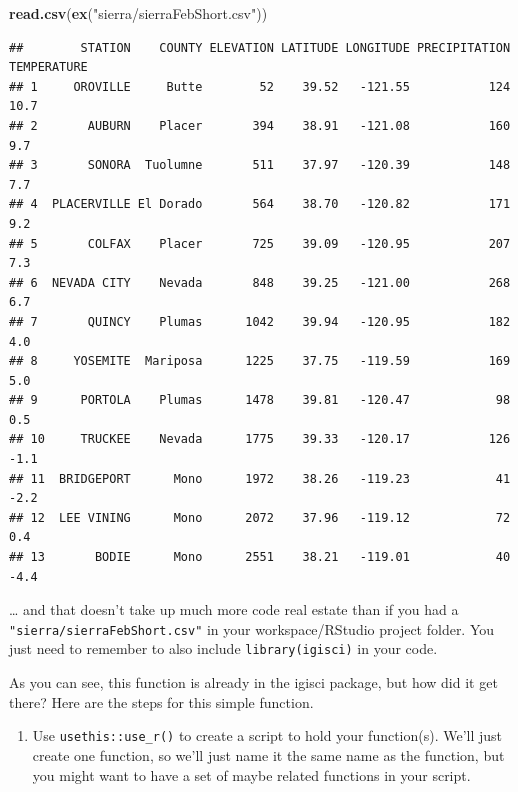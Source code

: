 \documentclass[
]{book}
\newenvironment{Shaded}{\begin{snugshade}}{\end{snugshade}}
\newcommand{\FunctionTok}[1]{\textcolor[rgb]{0.27,0.27,0.27}{\textbf{#1}}}
\newcommand{\NormalTok}[1]{#1}
\newcommand{\StringTok}[1]{\textcolor[rgb]{0.5,0.5,0.5}{#1}}
\providecommand{\tightlist}{%
  \setlength{\itemsep}{0pt}\setlength{\parskip}{0pt}}
\begin{document}
\begin{Shaded}
\begin{Highlighting}[]
\FunctionTok{read.csv}\NormalTok{(}\FunctionTok{ex}\NormalTok{(}\StringTok{"sierra/sierraFebShort.csv"}\NormalTok{))}
\end{Highlighting}
\end{Shaded}

\begin{verbatim}
##        STATION    COUNTY ELEVATION LATITUDE LONGITUDE PRECIPITATION TEMPERATURE
## 1     OROVILLE     Butte        52    39.52   -121.55           124        10.7
## 2       AUBURN    Placer       394    38.91   -121.08           160         9.7
## 3       SONORA  Tuolumne       511    37.97   -120.39           148         7.7
## 4  PLACERVILLE El Dorado       564    38.70   -120.82           171         9.2
## 5       COLFAX    Placer       725    39.09   -120.95           207         7.3
## 6  NEVADA CITY    Nevada       848    39.25   -121.00           268         6.7
## 7       QUINCY    Plumas      1042    39.94   -120.95           182         4.0
## 8     YOSEMITE  Mariposa      1225    37.75   -119.59           169         5.0
## 9      PORTOLA    Plumas      1478    39.81   -120.47            98         0.5
## 10     TRUCKEE    Nevada      1775    39.33   -120.17           126        -1.1
## 11  BRIDGEPORT      Mono      1972    38.26   -119.23            41        -2.2
## 12  LEE VINING      Mono      2072    37.96   -119.12            72         0.4
## 13       BODIE      Mono      2551    38.21   -119.01            40        -4.4
\end{verbatim}

\ldots{} and that doesn't take up much more code real estate than if you had a \texttt{"sierra/sierraFebShort.csv"} in your workspace/RStudio project folder. You just need to remember to also include \texttt{library(igisci)} in your code.

As you can see, this function is already in the igisci package, but how did it get there? Here are the steps for this simple function.

\begin{enumerate}
\def\labelenumi{\arabic{enumi}.}
\tightlist
\item
  Use \texttt{usethis::use\_r()} to create a script to hold your function(s). We'll just create one function, so we'll just name it the same name as the function, but you might want to have a set of maybe related functions in your script.
\end{enumerate}
\end{document}

